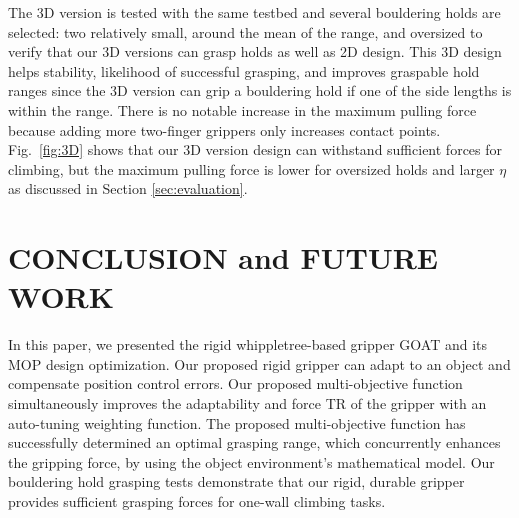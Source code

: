 \documentclass[letterpaper, 10 pt, conference]{ieeeconf}  %
\newcommand{\fig}[1]{Fig.~\ref{#1}}
\begin{document}
The 3D version is tested with the same testbed and several bouldering holds are selected: two relatively small, around the mean of the range, and oversized to verify that our 3D versions can grasp holds as well as 2D design.
This 3D design helps stability, likelihood of successful grasping, and improves graspable hold ranges since the 3D version can grip a bouldering hold if one of the side lengths is within the range. There is no notable increase in the maximum pulling force because adding more two-finger grippers only increases contact points. \fig{fig:3D} shows that our 3D version design can withstand sufficient forces for climbing, but the maximum pulling force is lower for oversized holds and larger $\eta$ as discussed in Section \ref{sec:evaluation}. 


\section{CONCLUSION and FUTURE WORK}\label{conclusion}
In this paper, we presented the rigid whippletree-based gripper GOAT and its MOP design optimization. Our proposed rigid gripper can adapt to an object and compensate position control errors.
Our proposed multi-objective function simultaneously improves the adaptability and force TR of the gripper with an auto-tuning weighting function. 
The proposed multi-objective function has successfully determined an optimal grasping range, which concurrently enhances the gripping force, by using the object environment's mathematical model.
Our bouldering hold grasping tests demonstrate that our rigid, durable gripper provides sufficient grasping forces for one-wall climbing tasks. %



\end{document}

